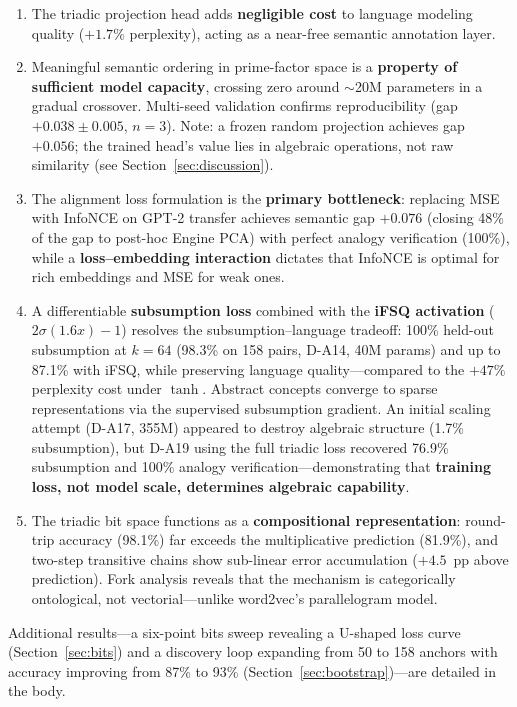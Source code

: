 \documentclass[11pt,a4paper]{article}
\begin{document}
\begin{enumerate}
    \item The triadic projection head adds \textbf{negligible cost} to language modeling quality ($+1.7\%$ perplexity), acting as a near-free semantic annotation layer.
    \item Meaningful semantic ordering in prime-factor space is a \textbf{property of sufficient model capacity}, crossing zero around $\sim$20M parameters in a gradual crossover. Multi-seed validation confirms reproducibility (gap $+0.038 \pm 0.005$, $n=3$). Note: a frozen random projection achieves gap $+0.056$; the trained head's value lies in algebraic operations, not raw similarity (see Section~\ref{sec:discussion}).
    \item The alignment loss formulation is the \textbf{primary bottleneck}: replacing MSE with InfoNCE on GPT-2 transfer achieves semantic gap $+0.076$ (closing 48\% of the gap to post-hoc Engine PCA) with perfect analogy verification (100\%), while a \textbf{loss--embedding interaction} dictates that InfoNCE is optimal for rich embeddings and MSE for weak ones.
    \item A differentiable \textbf{subsumption loss} combined with the \textbf{iFSQ activation} ($2\sigma(1.6x)-1$) resolves the subsumption--language tradeoff: 100\% held-out subsumption at $k=64$ (98.3\% on 158 pairs, D-A14, 40M params) and up to 87.1\% with iFSQ, while preserving language quality---compared to the $+47\%$ perplexity cost under $\tanh$. Abstract concepts converge to sparse representations via the supervised subsumption gradient. An initial scaling attempt (D-A17, 355M) appeared to destroy algebraic structure (1.7\% subsumption), but D-A19 using the full triadic loss recovered 76.9\% subsumption and 100\% analogy verification---demonstrating that \textbf{training loss, not model scale, determines algebraic capability}.
    \item The triadic bit space functions as a \textbf{compositional representation}: round-trip accuracy (98.1\%) far exceeds the multiplicative prediction (81.9\%), and two-step transitive chains show sub-linear error accumulation ($+4.5$~pp above prediction). Fork analysis reveals that the mechanism is categorically ontological, not vectorial---unlike word2vec's parallelogram model.
\end{enumerate}
Additional results---a six-point bits sweep revealing a U-shaped loss curve (Section~\ref{sec:bits}) and a discovery loop expanding from 50 to 158 anchors with accuracy improving from 87\% to 93\% (Section~\ref{sec:bootstrap})---are detailed in the body.
\end{document}
